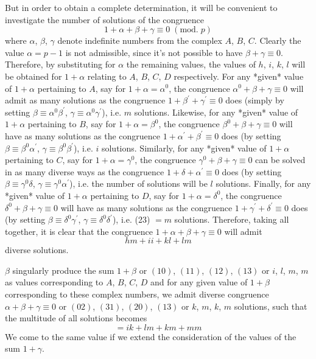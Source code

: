 \documentclass[twoside,12pt, showframe]{memoir}
\renewcommand{\pmod}[1]{\;(\textrm{mod.}\;#1)}
\begin{document}
But in order to obtain a complete determination, it will be convenient to investigate the number of solutions of the congruence
\[1+\alpha+\beta+\gamma \equiv 0\pmod{p}\]
where \(\alpha\), \(\beta\), \(\gamma\) denote indefinite numbers from the complex \(A\), \(B\), \(C\). Clearly the value \(\alpha=p-1\) is not admissible, since it's not possible to have \(\beta+\gamma \equiv 0\). Therefore, by substituting for \(\alpha\) the remaining values, the values of \(h\), \(i\), \(k\), \(l\) will be obtained for \(1+\alpha\) relating to \(A\), \(B\), \(C\), \(D\) respectively. For any *given* value of \(1+\alpha\) pertaining to \(A\), say for \(1+\alpha=\alpha^{0}\), the congruence \(\alpha^{0}+\beta+\gamma \equiv 0\) will admit as many solutions as the congruence \(1+\beta^{\prime}+\gamma^{\prime} \equiv 0\) does (simply by setting \(\beta \equiv \alpha^{0} \beta^{\prime}\), \(\gamma \equiv \alpha^{0} \gamma^{\prime}\)), i.e. \(m\) solutions. Likewise, for any *given* value of \(1+\alpha\) pertaining to \(B\), say for \(1+\alpha=\beta^{0}\), the congruence \(\beta^{0}+\beta+\gamma \equiv 0\) will have as many solutions as the congruence \(1+\alpha^{\prime}+\beta^{\prime} \equiv 0\) does (by setting \(\beta \equiv \beta^{0} \alpha^{\prime}\), \(\gamma \equiv \beta^{0} \beta^{\prime}\)), i.e. \(i\) solutions. Similarly, for any *given* value of \(1+\alpha\) pertaining to \(C\), say for \(1+\alpha=\gamma^{0}\), the congruence \(\gamma^{0}+\beta+\gamma \equiv 0\) can be solved in as many diverse ways as the congruence \(1+\delta+\alpha^{\prime} \equiv 0\) does (by setting \(\beta \equiv \gamma^{0} \delta\), \(\gamma \equiv \gamma^{0} \alpha^{\prime}\)), i.e. the number of solutions will be \(l\) solutions. Finally, for any *given* value of \(1+\alpha\) pertaining to \(D\), say for \(1+\alpha=\delta^{0}\), the congruence \(\delta^{0}+\beta+\gamma \equiv 0\) will have as many solutions as the congruence \(1+\gamma^{\prime}+\delta^{\prime} \equiv 0\) does (by setting \(\beta \equiv \delta^{0} \gamma^{\prime}\), \(\gamma \equiv \delta^{0} \delta^{\prime}\)), i.e. (23) \(=m\) solutions. Therefore, taking all together, it is clear that the congruence \(1+\alpha+\beta+\gamma \equiv 0\) will admit
\[h m+i i+k l+l m\]
diverse solutions.
%

\(\beta\) singularly produce the sum \(1+\beta\) or \((10)\), \((11)\), \((12)\), \((13)\) or \(i\), \(l\), \(m\), \(m\) as values corresponding to \(A\), \(B\), \(C\), \(D\) and for any given value of \(1+\beta\) corresponding to these complex numbers, we admit diverse congruence \(\alpha+\beta+\gamma \equiv 0\) or \((02)\), \((31)\), \((20)\), \((13)\) or \(k\), \(m\), \(k\), \(m\) solutions, such that the multitude of all solutions becomes
\[=i k+l m+k m+m m\]
We come to the same value if we extend the consideration of the values of the sum \(1+\gamma\).
%
\end{document}
